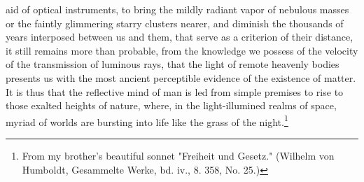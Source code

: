 aid of optical instruments, to bring the mildly radiant vapor of nebulous masses or the faintly glimmering starry clusters nearer, and diminish the thousands of years interposed between us and them, that serve as a criterion of their distance, it still remains more than probable, from the knowledge we possess of the velocity of the transmission of luminous rays, that the light of remote heavenly bodies presents us with the most ancient perceptible evidence of the existence of matter. It is thus that the reflective mind of man is led from simple premises to rise to those exalted heights of nature, where, in the light-illumined realms of space, myriad of worlds are bursting into life like the grass of the night.\footnote{From my brother's beautiful sonnet "Freiheit und Gesetz." (Wilhelm von Humboldt, Gesammelte Werke, bd. iv., 8. 358, No. 25.)}